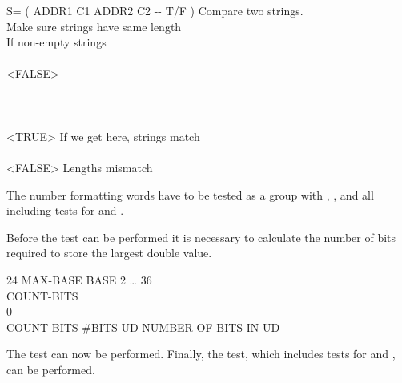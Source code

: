 \begin{tt}
\word{:} S=   ( ADDR1 C1 ADDR2 C2 -{}- T/F ) Compare two strings. \\
\tab  {}   \word{=} 	\tab[4.8]  Make sure strings have same length \\
\tab[2]     				\tab[6.2]  If non-empty strings \\
  \\
\tab[4]           \word{-}
				  <FALSE>    \\
\tab[4]           \\
\tab[3]      \\
\tab[2]    \\
\tab[2]    <TRUE>								\tab[5]  If we get here, strings match \\
\tab  {} \\
\tab[2]      <FALSE>		\tab[-0.4]  Lengths mismatch \\
\tab  {} \word{;}
\end{tt}

The number formatting words have to be tested as a group with
	,
	, and
	 all including tests for
	 and .

Before the  test can be performed it is
necessary to calculate the number of bits required to store the
largest double value.

\begin{tt}
24  MAX-BASE							\tab[7.6]  BASE 2 {\ldots} 36 \\
\word{:} COUNT-BITS \\
 0 
	       
	 \word{;} \\
COUNT-BITS   \#BITS-UD		\tab {} NUMBER OF BITS IN UD
\end{tt}

The  test can now be performed.
Finally, the  test, which includes tests for
 and , can be performed.

